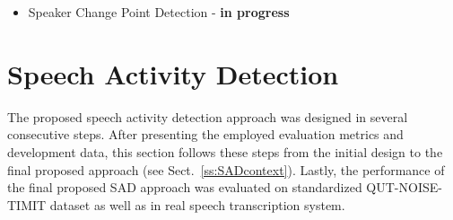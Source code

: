 \documentclass[FM,noheader,EN,bwtitles]{tulthesis}
\begin{document}
\begin{itemize}
	\item Speaker Change Point Detection - \textbf{in progress}
	
	
	
\end{itemize}	




\section{Speech Activity Detection}
\label{ch:SAD}
The proposed speech activity detection approach was designed in several consecutive steps.
After presenting the employed evaluation metrics and development data, this section follows these steps from the initial design to the final proposed approach (see Sect.~\ref{ss:SADcontext}).
Lastly, the performance of the final proposed SAD approach was evaluated on standardized QUT-NOISE-TIMIT dataset as well as in real speech transcription system.
\end{document}
